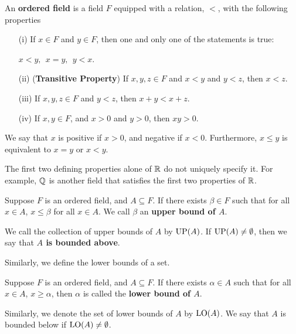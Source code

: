 \documentclass[a4paper]{report}
\begin{document}
\begin{definition}\label{Ordered Fields}
    An \textbf{ordered field} is a field \( F  \) equipped with a relation, \( <  \), with the following properties 
    \begin{enumerate}
        \item[(i)] If \( x \in F  \) and \( y \in F  \), then one and only one of the statements is true:
            \begin{center}
                \( x <y , \ \ x = y, \ \  y < x  \).
            \end{center}
        \item[(ii)](\textbf{Transitive Property}) If \( x,y,z \in F  \) and \( x < y  \) and \( y < z  \), then \( x < z  \).
        \item[(iii)] If \( x,y, z \in F  \) and \(  y < z  \), then \( x + y < x + z  \).
        \item[(iv)] If \( x,y \in F  \), and \( x > 0  \) and \( y > 0  \), then \( xy > 0  \).
    \end{enumerate}
\end{definition}

\begin{remark}
   We say that \( x  \) is positive if \( x > 0  \), and negative if \( x < 0  \). Furthermore, \( x \leq y  \) is equivalent to \( x = y  \) or \( x < y  \). 
\end{remark}

The first two defining properties alone of \( \mathbb{R}  \) do not uniquely specify it. For example, \( \mathbb{Q}  \) is another field that satisfies the first two properties of \( \mathbb{R}  \). 

\begin{definition}\label{Upper Bound}
   Suppose \( F  \) is an ordered field, and \( A \subseteq F  \). If there exists \( \beta \in F  \) such that for all \( x \in A  \), \( x \leq \beta  \) for all \( x \in A  \). We call \( \beta  \) an \textbf{upper bound of \( A  \)}.
\end{definition}
\begin{remark}
    We call the collection of upper bounds of \( A  \) by \( \operatorname{UP}(A) \). If \( \operatorname{UP}(A) \neq \emptyset  \), then we say that \textbf{\( A  \) is bounded above}. 
\end{remark}

Similarly, we define the lower bounds of a set.
\begin{definition}\label{Lower Bound}
   Suppose \( F  \) is an ordered field, and \( A \subseteq F \). If there exists \( \alpha \in A  \) such that for all \( x \in A  \), \( x \geq \alpha  \), then \( \alpha  \) is called the \textbf{lower bound of \( A  \)}.
\end{definition}
\begin{remark}
    Similarly, we denote the set of lower bounds of \( A  \) by \( \operatorname{LO}(A) \). We say that \( A  \) is bounded below if \( \operatorname{LO}(A) \neq \emptyset \).
\end{remark}
\end{document}
